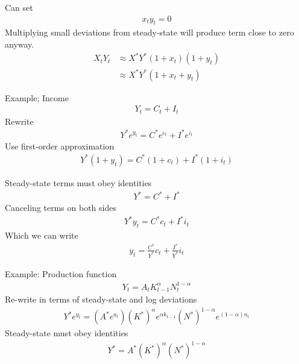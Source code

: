 \documentclass{beamer}
\begin{document}
\begin{frame}
 Can set
 \begin{align}
   x_ty_t=0
 \end{align}
  \medskip
  Multiplying small deviations from steady-state will produce term close to zero anyway.
\begin{align}
  X_tY_t &\approx X^*Y^*(1+x_t)(1+y_t) \\
  &\approx X^*Y^*(1+x_t+y_t)
\end{align}
\end{frame}



\begin{frame}
 Example; Income
  \begin{align} 
    Y_t=C_t+I_t 
  \end{align}
  \medskip
  Rewrite
 \begin{align} 
    Y^*e^{y_t}=C^*e^{c_t}+I^*e^{i_t} 
  \end{align}
  \medskip
  Use first-order approximation
 \begin{align} 
    Y^*(1+y_t) = C^*(1+c_t) + I^*(1+i_t) 
 \end{align}
\end{frame}

\begin{frame}
  Steady-state terms must obey identities
  \begin{align} 
     Y^* = C^* + I^* 
  \end{align}
  \medskip
  Canceling terms on both sides
 \begin{align} 
     Y^*y_t = C^*c_t + I^*i_t 
  \end{align}
  \medskip
  Which we can write
  \begin{align} 
     y_t=\frac{C^*}{Y^*}c_t+\frac{I^*}{Y^*}i_t 
  \end{align}
\end{frame}


\begin{frame}
  Example: Production function
  \begin{align}
    Y_t=A_tK^{\alpha}_{t-1}N^{1-\alpha}_t 
  \end{align}
  \medskip
  Re-write in terms of steady-state and log deviations
  \begin{align} 
     Y^*e^{y_t} = (A^* e^{a_t}) (K^*)^{\alpha}e^{\alpha k_{t-1}} (N^*)^{1-\alpha}e^{(1-\alpha)n_t}
  \end{align}
  \medskip
  Steady-state must obey identities
  \begin{align} 
    Y^* = A^* (K^*)^{\alpha} (N^*)^{1-\alpha} 
  \end{align}
\end{frame}
\end{document}
